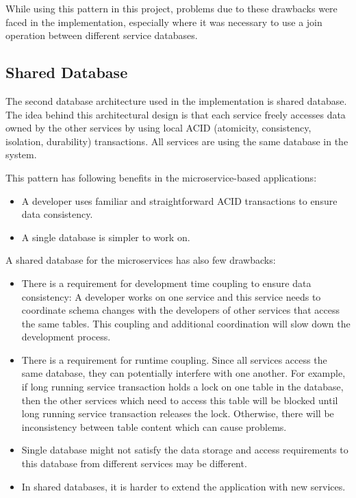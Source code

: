 \documentclass{article}
\begin{document}
\noindent While using this pattern in this project, problems due to these drawbacks were faced in the implementation, especially where it was necessary to use a join operation between different service databases.  
 

\subsection{Shared Database}

The second database architecture used in the implementation is shared database. The idea behind this architectural design is that each service freely accesses data owned by the other services by using local ACID (atomicity, consistency, isolation, durability) transactions\cite{microserviceSharedDB}. All services are using the same database in the system. 

\bigbreak
\noindent This pattern has following benefits in the microservice-based applications\cite{microserviceSharedDB}:

\begin{itemize}
    \item 	A developer uses familiar and straightforward ACID transactions to ensure data consistency.
    \item	A single database is simpler to work on.
\end{itemize}

\noindent A shared database for the microservices has also few drawbacks\cite{microserviceSharedDB, mic}:

\begin{itemize}
    \item 	There is a requirement for development time coupling to ensure data consistency:  A developer works on one service and this service needs to coordinate schema changes with the developers of other services that access the same tables. This coupling and additional coordination will slow down the development process.
    \item There is a requirement for runtime coupling. Since all services access the same database, they can potentially interfere with one another. For example, if long running service transaction holds a lock on one table in the database, then the other services which need to access this table will be blocked until long running service transaction releases the lock. Otherwise, there will be inconsistency between table content which can cause problems.
    \item Single database might not satisfy the data storage and access requirements to this database from different services may be different.
    \item In shared databases, it is harder to extend the application with new services. 
\end{itemize}
\end{document}
